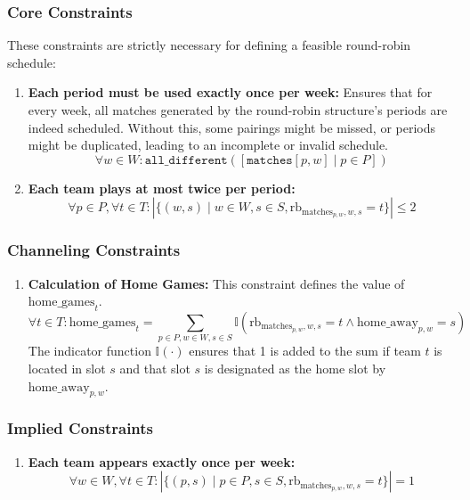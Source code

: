 \subsubsection{Core Constraints}
These constraints are strictly necessary for defining a feasible round-robin schedule:
\begin{enumerate}
    \item \textbf{Each period must be used exactly once per week:} Ensures that for every week, all matches generated by the round-robin structure's periods are indeed scheduled. Without this, some pairings might be missed, or periods might be duplicated, leading to an incomplete or invalid schedule.
    \[ \forall w \in W : \texttt{all\_different}([\texttt{matches}[p, w] \mid p \in P]) \]

    \item \textbf{Each team plays at most twice per period:} 
\[ \forall p \in P, \forall t \in T : \left| \{ (w, s) \mid w \in W, s \in S, \text{rb}_{\text{matches}_{p, w}, w, s} = t \} \right| \leq 2 \]

\end{enumerate}

\subsubsection{Channeling Constraints}
\begin{enumerate}
 \item \textbf{Calculation of Home Games:} This constraint defines the value of $\text{home\_games}_{t}$.
\[ \forall t \in T : \text{home\_games}_{t} = \sum_{p \in P, w \in W, s \in S} \mathbb{I}\left( \text{rb}_{\text{matches}_{p, w}, w, s} = t \land \text{home\_away}_{p, w} = s \right) \]
The indicator function $\mathbb{I}(\cdot)$ ensures that 1 is added to the sum if team $t$ is located in slot $s$ and that slot $s$ is designated as the home slot by $\text{home\_away}_{p,w}$.
\end{enumerate}

\subsubsection{Implied Constraints}
\begin{enumerate}
    \item \textbf{Each team appears exactly once per week:}
    \[ \forall w \in W, \forall t \in T : \left| \{ (p, s) \mid p \in P, s \in S, \text{rb}_{\text{matches}_{p, w}, w, s} = t \} \right| = 1 \]
\end{enumerate}

